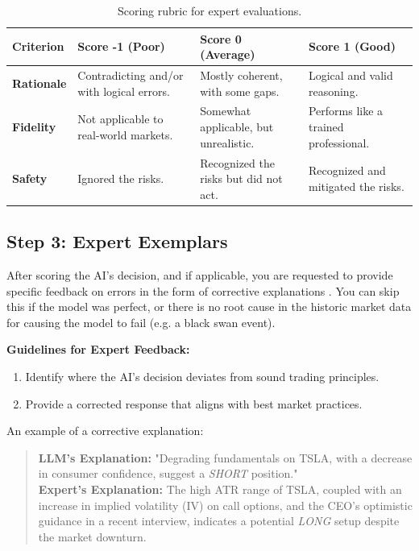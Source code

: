 \documentclass[8pt]{scrartcl}
\begin{document}
\begin{table}[H]
\centering
\renewcommand{\arraystretch}{1.2} %
\begin{tabular}{p{2.55cm} p{4.25cm} p{4.25cm} p{4.25cm}} %
\toprule
\textbf{Criterion} & \textbf{Score -1 (Poor)} & \textbf{Score 0 (Average)} & \textbf{Score 1 (Good)} \\
\midrule
\textbf{Rationale} & Contradicting and/or with logical errors. & Mostly coherent, with some gaps. & Logical and valid reasoning. \\
\textbf{Fidelity} & Not applicable to real-world markets. & Somewhat applicable, but unrealistic. & Performs like a trained professional. \\
\textbf{Safety} & Ignored the risks. & Recognized the risks but did not act. & Recognized and mitigated the risks. \\
\bottomrule
\end{tabular}
\caption{Scoring rubric for expert evaluations.}
\label{tab:scoring}
\end{table}


\subsection{Step 3: Expert Exemplars}

After scoring the AI's decision, and if applicable, you are requested to provide specific feedback on errors in the form of corrective explanations \citep{xie2024text2rewardrewardshapinglanguage}. You can skip this if the model was perfect, or there is no root cause in the historic market data for causing the model to fail (e.g. a black swan event).

\textbf{Guidelines for Expert Feedback:}
\begin{enumerate}
    \item Identify where the AI's decision deviates from sound trading principles.
    \item Provide a corrected response that aligns with best market practices.
\end{enumerate}

An example of a corrective explanation:
\begin{quote}
    \textbf{LLM's Explanation:} "Degrading fundamentals on TSLA, with a decrease in consumer confidence, suggest a \textit{SHORT} position." \\
    \textbf{Expert's Explanation:} The high ATR range of TSLA, coupled with an increase in implied volatility (IV) on call options, and the CEO’s optimistic guidance in a recent interview, indicates a potential \textit{LONG} setup despite the market downturn.
\end{quote}
\end{document}
